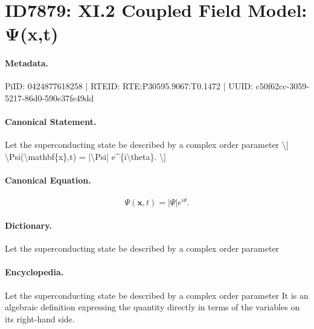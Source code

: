 \section*{ID7879: XI.2 Coupled Field Model: Ψ(x,t)}
\paragraph{Metadata.}
PiID: 0424877618258 | RTEID: RTE:P30595.9067:T0.1472 | UUID: c50f62cc-3059-5217-86d0-590e37fe49dd

\paragraph{Canonical Statement.}
Let the superconducting state be described by a complex order parameter \textbackslash{}[ \textbackslash{}Psi(\textbackslash{}mathbf\{x\},t) = |\textbackslash{}Psi| e\textasciicircum{}\{i\textbackslash{}theta\}. \textbackslash{}]

\paragraph{Canonical Equation.}
\[
\Psi(\mathbf{x},t) = |\Psi| e^{i\theta}.
\]

\paragraph{Dictionary.}
Let the superconducting state be described by a complex order parameter

\paragraph{Encyclopedia.}
Let the superconducting state be described by a complex order parameter It is an algebraic definition expressing the quantity directly in terms of the variables on its right-hand side.
